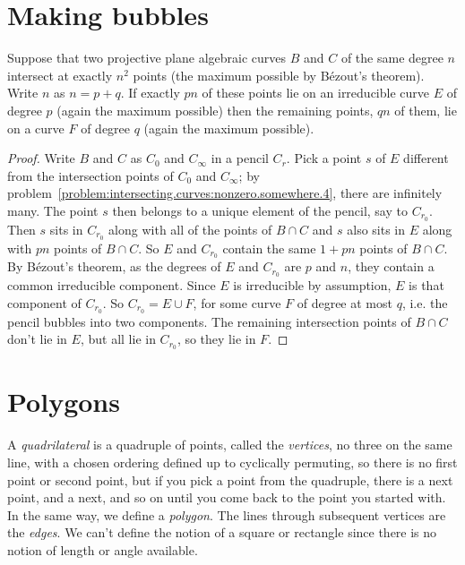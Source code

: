 \section{Making bubbles}
\begin{lemma}\label{lemma:bubble}
Suppose that two projective plane algebraic curves \(B\) and \(C\) of the same degree \(n\) intersect at exactly \(n^2\) points (the maximum possible by B\'ezout's theorem).
Write \(n\) as \(n=p+q\).
If exactly \(pn\) of these points lie on an irreducible curve \(E\) of degree \(p\) (again the maximum possible) then the remaining points, \(qn\) of them, lie on a curve \(F\) of degree \(q\) (again the maximum possible).
\end{lemma}
\begin{proof}
Write \(B\) and \(C\) as \(C_0\) and \(C_{\infty}\) in a pencil \(C_r\).
Pick a point \(s\) of \(E\) different from the intersection points of \(C_0\) and \(C_{\infty}\); by problem~\vref{problem:intersecting.curves:nonzero.somewhere.4}, there are infinitely many.
The point \(s\) then belongs to a unique element of the pencil, say to \(C_{r_0}\).
Then \(s\) sits in \(C_{r_0}\) along with all of the points of \(B \cap C\) and \(s\) also sits in \(E\) along with \(pn\) points of \(B \cap C\).
So \(E\) and \(C_{r_0}\) contain the same \(1+pn\) points of \(B \cap C\).
By B\'ezout's theorem, as the degrees of \(E\) and \(C_{r_0}\) are \(p\) and \(n\), they contain a common irreducible component.
Since \(E\) is irreducible by assumption, \(E\) is that component of \(C_{r_0}\).
So \(C_{r_0} = E \cup F\), for some curve \(F\) of degree at most \(q\), i.e. the pencil bubbles into two components.
The remaining intersection points of \(B \cap C\) don't lie in \(E\), but all lie in \(C_{r_0}\), so they lie in \(F\).
\end{proof}

\section{Polygons}\label{section:polygons}
A \emph{quadrilateral} is a quadruple of points, called the \emph{vertices}, no three on the same line, with a chosen ordering defined up to cyclically permuting, so there is no first point or second point, but if you pick a point from the quadruple, there is a next point, and a next, and so on until you come back to the point you started with.
In the same way, we define a \emph{polygon}.
The lines through subsequent vertices are the \emph{edges}.
We can't define the notion of a square or rectangle since there is no notion of length or angle available.

